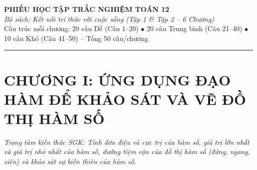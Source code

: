 \documentclass[11pt,a4paper]{article}
\begin{document}
\begin{center}
  {\LARGE\bfseries\color{primary} PHIẾU HỌC TẬP TRẮC NGHIỆM TOÁN 12}\\[4pt]
  {\normalsize\itshape\color{accent} Bộ sách: Kết nối tri thức với cuộc sống (Tập 1 \& Tập 2 – 6 Chương)}\\[4pt]
  {\small Cấu trúc mỗi chương: 20 câu Dễ (Câu 1--20) $\bullet$ 20 câu Trung bình (Câu 21--40) $\bullet$ 10 câu Khó (Câu 41--50) -- Tổng 50 câu/chương}
\end{center}
\vspace{6pt}\hrule\vspace{10pt}
\section*{\color{primary} CHƯƠNG I: ỨNG DỤNG ĐẠO HÀM ĐỂ KHẢO SÁT VÀ VẼ ĐỒ THỊ HÀM SỐ}
\textit{Trọng tâm kiến thức SGK: Tính đơn điệu và cực trị của hàm số, giá trị lớn nhất và giá trị nhỏ nhất của hàm số, đường tiệm cận của đồ thị hàm số (đứng, ngang, xiên) và khảo sát sự biến thiên của hàm số.}\par\vspace{4pt}
\end{document}
